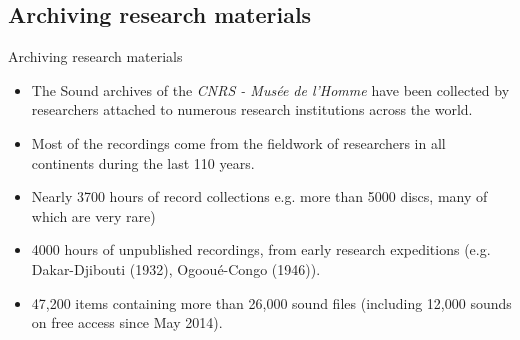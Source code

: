 \documentclass[final, hyperref, table]{beamer}
\begin{document}
\subsection{ Archiving research materials}
\begin{frame}{Archiving research materials}
  \begin{block}{}%
    \begin{itemize}
    \item The Sound archives of the \emph{CNRS - Musée de l'Homme}
      have been collected by researchers attached to numerous research
      institutions across the world. %
    \item Most of the recordings come from the fieldwork of
      researchers in \alert{all continents} during the last \alert{110 years}.
    

    \item Nearly \alert{3700 hours of record collections} 
    e.g. more than 5000 discs, many of which are very
      rare)
    \item \alert{4000 hours of unpublished recordings}, from early
      research expeditions (e.g. Dakar-Djibouti (1932), Ogooué-Congo
      (1946)).
    \item \alert{47,200 items} containing more than
      \alert{26,000 sound files} (including 12,000 sounds on free
      access since May 2014).
   
   
   
    \end{itemize}
  \end{block}

\end{frame}
\end{document}
